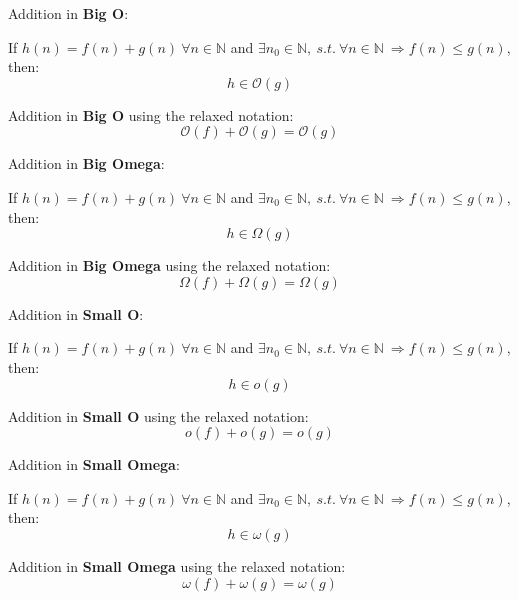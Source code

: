   \begin{lemma} Addition in \textbf{Big O}: 

If  $ h(n) = f(n) + g(n)\  \forall n \in  \mathbb{N} $ and $\exists n_{0} \in \mathbb{N},\ s.t.\ \forall n \in \mathbb{N} \ \Rightarrow f(n) \leq g(n)$, then:
 \[  h \in \mathcal{O}(g)\]
 
  \end{lemma}
   \begin{corollary} Addition in \textbf{Big O} using the relaxed notation: 
  \[  \mathcal{O}(f) + \mathcal{O}(g) = \mathcal{O}(g)\]
  \end{corollary}  
  
  \begin{lemma} Addition in \textbf{Big Omega}: 

If  $ h(n) = f(n) + g(n)\  \forall n \in  \mathbb{N} $ and $\exists n_{0} \in \mathbb{N},\ s.t.\ \forall n \in \mathbb{N} \ \Rightarrow f(n) \leq g(n)$, then:
 \[  h \in \Omega(g)\]
 
  \end{lemma}
   \begin{corollary} Addition in \textbf{Big Omega} using the relaxed notation: 
  \[  \Omega(f) + \Omega(g) = \Omega(g)\]
  \end{corollary}
  
  \begin{lemma} Addition in \textbf{Small O}:

If  $ h(n) = f(n) + g(n)\  \forall n \in  \mathbb{N} $ and $\exists n_{0} \in \mathbb{N},\ s.t.\ \forall n \in \mathbb{N} \ \Rightarrow f(n) \leq g(n)$, then:
 \[  h \in o(g)\]
 
  \end{lemma}
  \begin{corollary} Addition in \textbf{Small O} using the relaxed notation:
  \[  o(f) + o(g) = o(g)\]
  \end{corollary}  
  
  \begin{lemma} Addition in \textbf{Small Omega}:

If  $ h(n) = f(n) + g(n)\  \forall n \in  \mathbb{N} $ and $\exists n_{0} \in \mathbb{N},\ s.t.\ \forall n \in \mathbb{N} \ \Rightarrow f(n) \leq g(n)$, then:
 \[  h \in \omega(g)\]
 
  \end{lemma}
  \begin{corollary} Addition in \textbf{Small Omega} using the relaxed notation:
  \[  \omega(f) + \omega(g) = \omega(g)\]
  \end{corollary}
